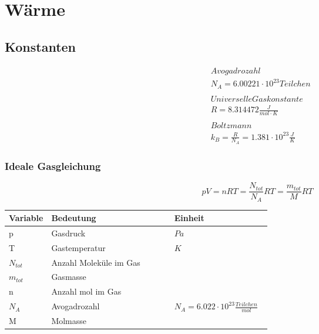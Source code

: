 



\chapter{Wärme}

\section{Konstanten}
\[
\boxed{\begin{aligned}	
		&Avogadrozahl \\
		&N_{A} = 6.00221 \cdot 10^{23} Teilchen\\
		\\
		&Universelle Gaskonstante\\
		&R = 8.314472 \frac{J}{mol \cdot K}\\
		\\
		&Boltzmann\\
		&k_{B} = \frac{R}{N_{A}}=1.381 \cdot 10^{23} \frac{J}{K}
	\end{aligned}}	\]

\subsection{Ideale Gasgleichung}

\[pV = nRT = \frac{N_{tot}}{N_{A}}RT = \frac{m_{tot}}{M}RT\]

\begin{tabular*}{\linewidth}{p{0.15\linewidth}lp{0.37\linewidth}}
	\textbf{Variable}				&	\textbf{Bedeutung}		& \textbf{Einheit}\\
	\hline
	\rowcolor{white}p			&      Gasdruck				&$Pa$\\
	\rowcolor{lgray}T			&	Gastemperatur			& $K$\\
	\rowcolor{white}$N_{tot}$	&	Anzahl Moleküle im Gas	&$ $\\				
	\rowcolor{lgray}$m_{tot}$	&	Gasmasse				&$ $\\
	\rowcolor{white}n			&	Anzahl mol im Gas		&$ $\\
	\rowcolor{lgray}$N_{A}$		&	Avogadrozahl			&$N_{A} = 6.022 \cdot 10^{23} \frac{Teilchen}{mol}$\\	
	\rowcolor{white}M			&	Molmasse				&$ $\\
\end{tabular*}


